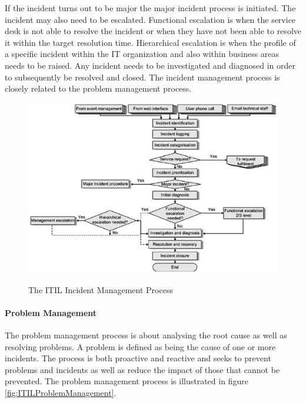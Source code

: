 If the incident turns out to be major the major incident process is initiated. The incident may also need to be escalated. Functional escalation is when the service desk is not able to resolve the incident or when they have not been able to resolve it within the target resolution time. Hierarchical escalation is when the profile of a specific incident within the IT organization and also within business areas needs to be raised. Any incident needs to be investigated and diagnosed in order to subsequently be resolved and closed. The incident management process is closely related to the problem management process.

\begin{figure}
\centering
\scalebox{0.48}
{\includegraphics{ITILIncidentManagement.png}}
\caption[The ITIL Incident Management Process]{The ITIL Incident Management Process \cite{itilbok}} 
\label{fig:ITILIncidentManagement}
\end{figure}

\paragraph{Problem Management}
The problem management process is about analysing the root cause as well as resolving problems. A problem is defined as being the cause of one or more incidents. The process is both proactive and reactive and seeks to prevent problems and incidents as well as reduce the impact of those that cannot be prevented. The problem management process is illustrated in figure \ref{fig:ITILProblemManagement}. 

